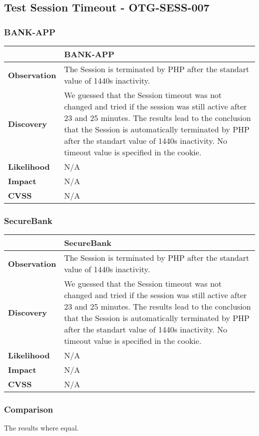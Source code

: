\subsection{Test Session Timeout - OTG-SESS-007}
\subsubsection{BANK-APP}
\begin{tabular*}{\textwidth}{ p{} | p{} }\hline
    & \textbf{BANK-APP} \\ \hline
    \textbf{Observation} & 
    	The Session is terminated by PHP after the standart value of 1440s inactivity.
    \\
    \textbf{Discovery} & 
    	We guessed that the Session timeout was not changed and tried if the session was still active after 23 and 25 minutes.
    	The results lead to the conclusion that the Session is automatically terminated by PHP after the standart value of 1440s inactivity.
    	No timeout value is specified in the cookie.
    \\
    \textbf{Likelihood} & 
    	N/A
    \\
    \textbf{Impact} & 
    	N/A
    \\
    \textbf{CVSS} & 
        N/A
    \\
   	\hline
\end{tabular*}

\subsubsection{SecureBank}
\begin{tabular*}{\textwidth}{ p{} | p{} }\hline
    & \textbf{SecureBank} \\ \hline
    \textbf{Observation} & 
    	The Session is terminated by PHP after the standart value of 1440s inactivity.
    \\
    \textbf{Discovery} & 
    	We guessed that the Session timeout was not changed and tried if the session was still active after 23 and 25 minutes.
    	The results lead to the conclusion that the Session is automatically terminated by PHP after the standart value of 1440s inactivity.
    	No timeout value is specified in the cookie.
    \\
    \textbf{Likelihood} & 
    	N/A
    \\
    \textbf{Impact} & 
    	N/A
    \\
    \textbf{CVSS} & 
        N/A
    \\
   	\hline
\end{tabular*}

\subsubsection{Comparison}
The results where equal.
\clearpage